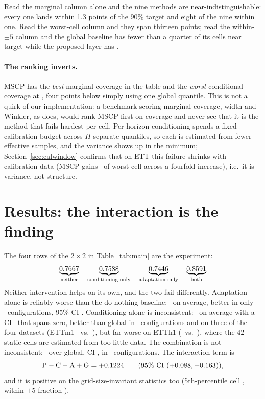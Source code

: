 \documentclass[11pt]{article}
\begin{document}
Read the marginal column alone and the nine methods are near-indistinguishable: every one lands within 1.3 points of the 90\% target and eight of the nine within one. Read the worst-cell column and they span thirteen points; read the within-$\pm 5$ column and the global baseline has fewer than a quarter of its cells near target while the proposed layer has \ettPropDWithin.

\paragraph{The ranking inverts.} MSCP has the \emph{best} marginal coverage in the table and the \emph{worst} conditional coverage at \ettMSCPWorst, four points below simply using one global quantile. This is not a quirk of our implementation: a benchmark scoring marginal coverage, width and Winkler, as \citet{cpsurvey} does, would rank MSCP first on coverage and never see that it is the method that fails hardest per cell. Per-horizon conditioning spends a fixed calibration budget across $H$ separate quantiles, so each is estimated from fewer effective samples, and the variance shows up in the minimum; Section~\ref{sec:calwindow} confirms that on ETT this failure shrinks with calibration data (MSCP gains \cwettMSCPGain\ of worst-cell across a fourfold increase), i.e.\ it is variance, not structure.

\section{Results: the interaction is the finding}\label{sec:results}

The four rows of the $2 \times 2$ in Table~\ref{tab:main} are the experiment:
\[
\underbrace{0.7667}_{\text{neither}} \quad
\underbrace{0.7588}_{\text{conditioning only}} \quad
\underbrace{0.7446}_{\text{adaptation only}} \quad
\underbrace{0.8591}_{\text{both}}
\]
Neither intervention helps on its own, and the two fail differently. Adaptation alone is reliably worse than the do-nothing baseline: \ettAminusGD\ on average, better in only \ettACIdWinsG\ configurations, 95\% CI \ettAminusGCID. Conditioning alone is inconsistent: \ettCminusG\ on average with a CI \ettCminusGCI\ that spans zero, better than global in \ettCondWinsG\ configurations and on three of the four datasets (ETTm1 \ettCondWorstETTmOne\ vs.\ \ettGlobalWorstETTmOne), but far worse on ETTh1 (\ettCondWorstETThOne\ vs.\ \ettGlobalWorstETThOne), where the 42 static cells are estimated from too little data. The combination is not inconsistent: \ettPminusGD\ over global, CI \ettPminusGCID, in \ettPropDWinsG\ configurations. The interaction term is
\[
\text{P} - \text{C} - \text{A} + \text{G} = +0.1224 \qquad (95\%\ \text{CI } (+0.088, +0.163)),
\]
and it is positive on the grid-size-invariant statistics too (5th-percentile cell \ettInteractionPfiveD, within-$\pm 5$ fraction \ettInteractionWithinD).
\end{document}
